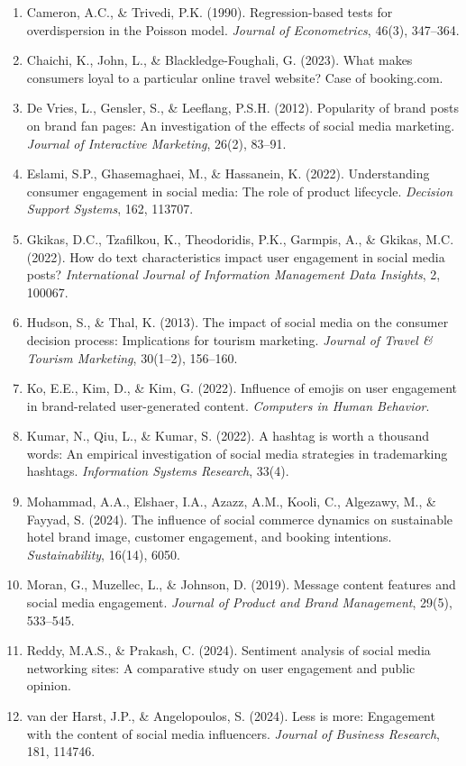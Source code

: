 \documentclass[12pt,a4paper]{article}
\begin{document}
\begin{enumerate}
    \item Cameron, A.C., \& Trivedi, P.K. (1990). Regression-based tests for overdispersion in the Poisson model. \textit{Journal of Econometrics}, 46(3), 347--364.
    \item Chaichi, K., John, L., \& Blackledge-Foughali, G. (2023). What makes consumers loyal to a particular online travel website? Case of booking.com.
    \item De Vries, L., Gensler, S., \& Leeflang, P.S.H. (2012). Popularity of brand posts on brand fan pages: An investigation of the effects of social media marketing. \textit{Journal of Interactive Marketing}, 26(2), 83--91.
    \item Eslami, S.P., Ghasemaghaei, M., \& Hassanein, K. (2022). Understanding consumer engagement in social media: The role of product lifecycle. \textit{Decision Support Systems}, 162, 113707.
    \item Gkikas, D.C., Tzafilkou, K., Theodoridis, P.K., Garmpis, A., \& Gkikas, M.C. (2022). How do text characteristics impact user engagement in social media posts? \textit{International Journal of Information Management Data Insights}, 2, 100067.
    \item Hudson, S., \& Thal, K. (2013). The impact of social media on the consumer decision process: Implications for tourism marketing. \textit{Journal of Travel \& Tourism Marketing}, 30(1--2), 156--160.
    \item Ko, E.E., Kim, D., \& Kim, G. (2022). Influence of emojis on user engagement in brand-related user-generated content. \textit{Computers in Human Behavior}.
    \item Kumar, N., Qiu, L., \& Kumar, S. (2022). A hashtag is worth a thousand words: An empirical investigation of social media strategies in trademarking hashtags. \textit{Information Systems Research}, 33(4).
    \item Mohammad, A.A., Elshaer, I.A., Azazz, A.M., Kooli, C., Algezawy, M., \& Fayyad, S. (2024). The influence of social commerce dynamics on sustainable hotel brand image, customer engagement, and booking intentions. \textit{Sustainability}, 16(14), 6050.
    \item Moran, G., Muzellec, L., \& Johnson, D. (2019). Message content features and social media engagement. \textit{Journal of Product and Brand Management}, 29(5), 533--545.
    \item Reddy, M.A.S., \& Prakash, C. (2024). Sentiment analysis of social media networking sites: A comparative study on user engagement and public opinion.
    \item van der Harst, J.P., \& Angelopoulos, S. (2024). Less is more: Engagement with the content of social media influencers. \textit{Journal of Business Research}, 181, 114746.
\end{enumerate}
\end{document}
